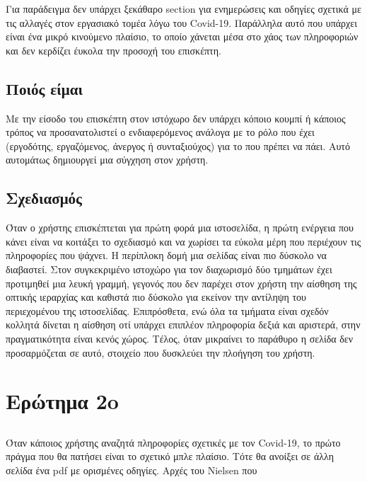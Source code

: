 \documentclass[12pt]{article}
\begin{document}
Για παράδειγμα δεν υπάρχει ξεκάθαρο \textlatin{section} για ενημερώσεις και οδηγίες σχετικά με τις αλλαγές στον εργασιακό τομέα λόγω του \textlatin{Covid-19}. Παράλληλα αυτό που υπάρχει είναι ένα μικρό κινούμενο πλαίσιο, το οποίο χάνεται μέσα στο χάος των πληροφοριών και δεν κερδίζει έυκολα την προσοχή του επισκέπτη.

\subsection{Ποιός είμαι}
Με την είσοδο του επισκέπτη στον ιστόχωρο δεν υπάρχει κόποιο κουμπί ή κάποιος τρόπος να  προσανατολιστεί ο ενδιαφερόμενος ανάλογα με το ρόλο που έχει (εργοδότης, εργαζόμενος, άνεργος ή συνταξιούχος) για το που πρέπει να πάει. Αυτό αυτομάτως δημιουργεί μια σύγχηση στον χρήστη.

\subsection{Σχεδιασμός}
Όταν ο χρήστης επισκέπτεται για πρώτη φορά μια ιστοσελίδα, η πρώτη ενέργεια που κάνει είναι να κοιτάξει το σχεδιασμό και να χωρίσει τα εύκολα μέρη που περιέχουν τις  πληροφορίες που ψάχνει. Η περίπλοκη δομή μια σελίδας είναι πιο δύσκολο να διαβαστεί. Στον συγκεκριμένο ιστοχώρο για τον διαχωρισμό δύο τμημάτων έχει προτιμηθεί μια λευκή γραμμή, γεγονός που δεν παρέχει στον χρήστη την αίσθηση της οπτικής ιεραρχίας και καθιστά πιο δύσκολο για εκείνον την αντίληψη του περιεχομένου της ιστοσελίδας. Επιπρόσθετα, ενώ όλα τα τμήματα είναι σχεδόν κολλητά δίνεται η αίσθηση οτί υπάρχει επιπλέον πληροφορία δεξιά και αριστερά, στην πραγματικότητα είναι κενός χώρος. Τέλος, όταν μικραίνει το παράθυρο η σελίδα δεν προσαρμόζεται σε αυτό, στοιχείο που δυσκλεύει την πλοήγηση του χρήστη. 

\section{Ερώτημα 2o}

\subsection{}
Όταν κάποιος χρήστης αναζητά πληροφορίες σχετικές με τον \textlatin{Covid-19}, το πρώτο πράγμα που θα πατήσει είναι το σχετικό μπλε πλαίσιο. Τότε θα ανοίξει σε άλλη σελίδα ένα \textlatin{pdf} με ορισμένες οδηγίες.  Αρχές του Nielsen που 
\newpage


\end{document}
